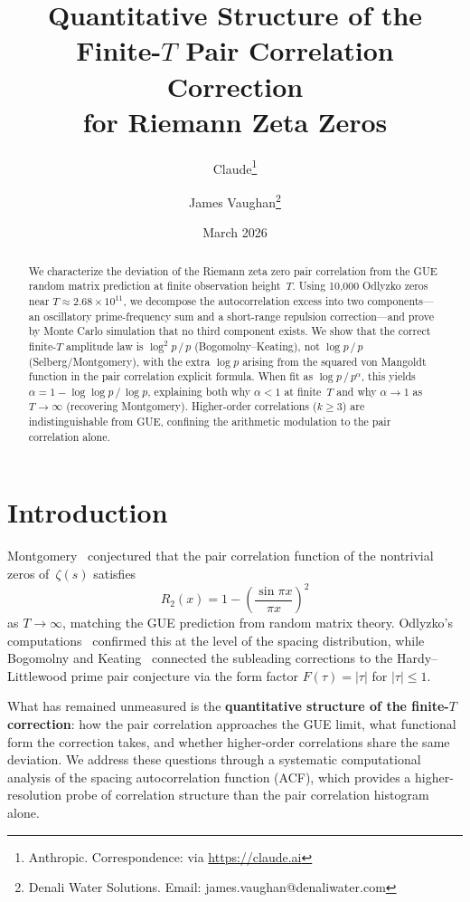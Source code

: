\documentclass[11pt,a4paper]{article}
\title{Quantitative Structure of the Finite-$T$ Pair Correlation Correction\\for Riemann Zeta Zeros}
\author{Claude\thanks{Anthropic. Correspondence: via \url{https://claude.ai}}
\and James Vaughan\thanks{Denali Water Solutions. Email: james.vaughan@denaliwater.com}}
\date{March 2026}
\begin{document}
\maketitle

\begin{abstract}
We characterize the deviation of the Riemann zeta zero pair correlation from the GUE random matrix prediction at finite observation height~$T$.
Using 10{,}000 Odlyzko zeros near $T \approx 2.68 \times 10^{11}$, we decompose the autocorrelation excess into two components---an oscillatory prime-frequency sum and a short-range repulsion correction---and prove by Monte Carlo simulation that no third component exists.
We show that the correct finite-$T$ amplitude law is $\log^2 p\,/\,p$ (Bogomolny--Keating), not $\log p\,/\,p$ (Selberg/Montgomery), with the extra $\log p$ arising from the squared von Mangoldt function in the pair correlation explicit formula.
When fit as $\log p\,/\,p^\alpha$, this yields $\alpha = 1 - \log\log p\,/\,\log p$, explaining both why $\alpha < 1$ at finite~$T$ and why $\alpha \to 1$ as $T \to \infty$ (recovering Montgomery).
Higher-order correlations ($k \ge 3$) are indistinguishable from GUE, confining the arithmetic modulation to the pair correlation alone.
\end{abstract}

\section{Introduction}

Montgomery~\cite{Montgomery1973} conjectured that the pair correlation function of the nontrivial zeros of~$\zeta(s)$ satisfies
\begin{equation}\label{eq:montgomery}
R_2(x) = 1 - \left(\frac{\sin \pi x}{\pi x}\right)^{\!2}
\end{equation}
as $T \to \infty$, matching the GUE prediction from random matrix theory.
Odlyzko's computations~\cite{Odlyzko2001} confirmed this at the level of the spacing distribution, while Bogomolny and Keating~\cite{Bogomolny1996} connected the subleading corrections to the Hardy--Littlewood prime pair conjecture via the form factor $F(\tau) = |\tau|$ for $|\tau| \le 1$.

What has remained unmeasured is the \textbf{quantitative structure of the finite-$T$ correction}: how the pair correlation approaches the GUE limit, what functional form the correction takes, and whether higher-order correlations share the same deviation.
We address these questions through a systematic computational analysis of the spacing autocorrelation function (ACF), which provides a higher-resolution probe of correlation structure than the pair correlation histogram alone.
\end{document}

